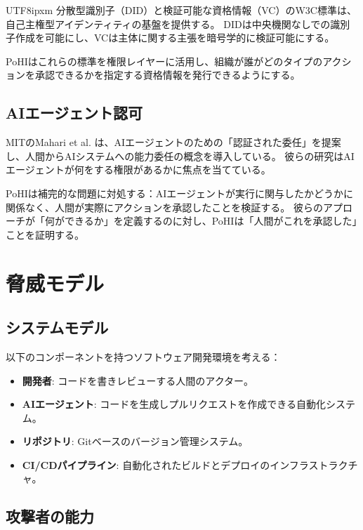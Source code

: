 \documentclass[a4paper,10pt]{article}
\begin{document}
\begin{CJK}{UTF8}{ipxm}
分散型識別子（DID）\cite{did}と検証可能な資格情報（VC）\cite{vc}のW3C標準は、自己主権型アイデンティティの基盤を提供する。
DIDは中央機関なしでの識別子作成を可能にし、VCは主体に関する主張を暗号学的に検証可能にする。

PoHIはこれらの標準を権限レイヤーに活用し、組織が誰がどのタイプのアクションを承認できるかを指定する資格情報を発行できるようにする。

\subsection{AIエージェント認可}

MITのMahari et al. \cite{mitdelegation}は、AIエージェントのための「認証された委任」を提案し、人間からAIシステムへの能力委任の概念を導入している。
彼らの研究はAIエージェントが何をする権限があるかに焦点を当てている。

PoHIは補完的な問題に対処する：AIエージェントが実行に関与したかどうかに関係なく、人間が実際にアクションを承認したことを検証する。
彼らのアプローチが「何ができるか」を定義するのに対し、PoHIは「人間がこれを承認した」ことを証明する。

\section{脅威モデル}

\subsection{システムモデル}

以下のコンポーネントを持つソフトウェア開発環境を考える：
\begin{itemize}
    \item \textbf{開発者}: コードを書きレビューする人間のアクター。
    \item \textbf{AIエージェント}: コードを生成しプルリクエストを作成できる自動化システム。
    \item \textbf{リポジトリ}: Gitベースのバージョン管理システム。
    \item \textbf{CI/CDパイプライン}: 自動化されたビルドとデプロイのインフラストラクチャ。
\end{itemize}

\subsection{攻撃者の能力}


\end{CJK}
\end{document}
